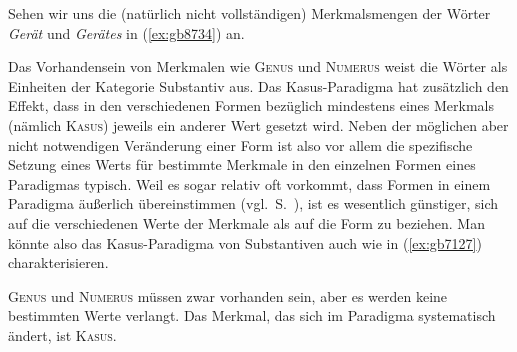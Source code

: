 Sehen wir uns die (natürlich nicht vollständigen) Merkmalsmengen der Wörter \textit{Gerät} und \textit{Gerätes} in (\ref{ex:gb8734}) an.

\begin{exe}
  \ex\label{ex:gb8734}
  \begin{xlist}
  \end{xlist}
\end{exe}

Das Vorhandensein von Merkmalen wie \textsc{Genus} und \textsc{Numerus} weist die Wörter als Einheiten der Kategorie Substantiv aus.
Das Kasus-Paradigma hat zusätzlich den Effekt, dass in den verschiedenen Formen bezüglich mindestens eines Merkmals (nämlich \textsc{Kasus}) jeweils ein anderer Wert gesetzt wird.
Neben der möglichen aber nicht notwendigen Veränderung einer Form ist also vor allem die spezifische Setzung eines Werts für bestimmte Merkmale in den einzelnen Formen eines Paradigmas typisch.
Weil es sogar relativ oft vorkommt, dass Formen in einem Paradigma äußerlich übereinstimmen (vgl.\ S.~\pageref{def:synkretismus}), ist es wesentlich günstiger, sich auf die verschiedenen Werte der Merkmale als auf die Form zu beziehen.
Man könnte also das Kasus-Paradigma von Substantiven auch wie in (\ref{ex:gb7127}) charakterisieren.


\begin{exe}
  \begin{xlist}
  \end{xlist}
\end{exe}

\textsc{Genus} und \textsc{Numerus} müssen zwar vorhanden sein, aber es werden keine bestimmten Werte verlangt.
Das Merkmal, das sich im Paradigma systematisch ändert, ist \textsc{Kasus}.

